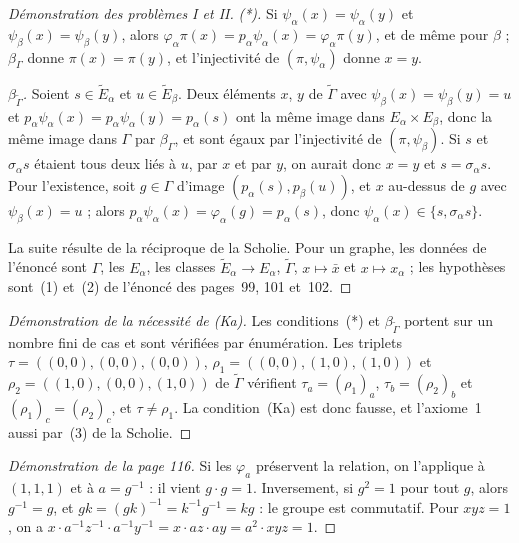 \begin{proof}[Démonstration des problèmes I et II]
\emph{(*).} Si $\psi_\alpha(x) = \psi_\alpha(y)$ et $\psi_\beta(x) = \psi_\beta(y)$, alors $\varphi_\alpha \pi(x) = p_\alpha \psi_\alpha(x) = \varphi_\alpha \pi(y)$, et de même pour $\beta$ ; $\beta_\Gamma$ donne $\pi(x) = \pi(y)$, et l'injectivité de $(\pi, \psi_\alpha)$ donne $x = y$.

\emph{$\beta_{\widetilde\Gamma}$.} Soient $s \in \widetilde E_\alpha$ et $u \in \widetilde E_\beta$. Deux éléments $x$, $y$ de $\widetilde\Gamma$ avec $\psi_\beta(x) = \psi_\beta(y) = u$ et $p_\alpha\psi_\alpha(x) = p_\alpha\psi_\alpha(y) = p_\alpha(s)$ ont la même image dans $E_\alpha \times E_\beta$, donc la même image dans $\Gamma$ par $\beta_\Gamma$, et sont égaux par l'injectivité de $(\pi, \psi_\beta)$. Si $s$ et $\sigma_\alpha s$ étaient tous deux liés à $u$, par $x$ et par $y$, on aurait donc $x = y$ et $s = \sigma_\alpha s$. Pour l'existence, soit $g \in \Gamma$ d'image $(p_\alpha(s), p_\beta(u))$, et $x$ au-dessus de $g$ avec $\psi_\beta(x) = u$ ; alors $p_\alpha \psi_\alpha(x) = \varphi_\alpha(g) = p_\alpha(s)$, donc $\psi_\alpha(x) \in \{s, \sigma_\alpha s\}$.

La suite résulte de la réciproque de la Scholie. Pour un graphe, les données de l'énoncé sont $\Gamma$, les $E_\alpha$, les classes $\widetilde E_\alpha \to E_\alpha$, $\widetilde\Gamma$, $x \mapsto \bar x$ et $x \mapsto x_\alpha$ ; les hypothèses sont~(1) et~(2) de l'énoncé des pages~99, 101 et~102.
\end{proof}

\begin{proof}[Démonstration de la nécessité de (Ka)]
Les conditions~(*) et $\beta_{\widetilde\Gamma}$ portent sur un nombre fini de cas et sont vérifiées par énumération. Les triplets $\tau = ((0,0), (0,0), (0,0))$, $\rho_1 = ((0,0), (1,0), (1,0))$ et $\rho_2 = ((1,0), (0,0), (1,0))$ de $\widetilde\Gamma$ vérifient $\tau_a = (\rho_1)_a$, $\tau_b = (\rho_2)_b$ et $(\rho_1)_c = (\rho_2)_c$, et $\tau \neq \rho_1$. La condition~(Ka) est donc fausse, et l'axiome~1 aussi par~(3) de la Scholie.
\end{proof}

\begin{proof}[Démonstration de la page 116]
Si les $\varphi_a$ préservent la relation, on l'applique à $(1, 1, 1)$ et à $a = g^{-1}$ : il vient $g \cdot g = 1$. Inversement, si $g^2 = 1$ pour tout $g$, alors $g^{-1} = g$, et $gk = (gk)^{-1} = k^{-1}g^{-1} = kg$ : le groupe est commutatif. Pour $xyz = 1$, on a $x \cdot a^{-1}z^{-1} \cdot a^{-1}y^{-1} = x \cdot az \cdot ay = a^2 \cdot xyz = 1$.
\end{proof}

